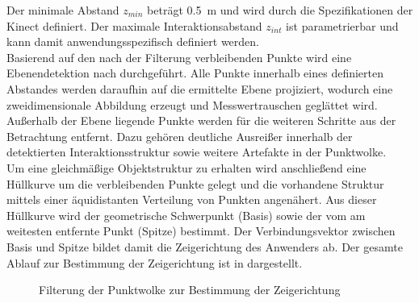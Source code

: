 Der minimale Abstand $z_{min}$ beträgt \SI{0,5}{\meter} und wird durch die Spezifikationen der Kinect definiert. Der maximale Interaktionsabstand $z_{int}$ ist parametrierbar und kann damit anwendungsspezifisch definiert werden.\\

Basierend auf den nach der Filterung verbleibenden Punkte wird eine Ebenendetektion nach \cite{Fischler1981} durchgeführt. Alle Punkte innerhalb eines definierten Abstandes werden daraufhin auf die ermittelte Ebene projiziert, wodurch eine zweidimensionale Abbildung erzeugt und Messwertrauschen geglättet wird. Außerhalb der Ebene liegende Punkte werden für die weiteren Schritte aus der Betrachtung entfernt. Dazu gehören deutliche Ausreißer innerhalb der detektierten Interaktionsstruktur sowie weitere Artefakte in der Punktwolke.\\

Um eine gleichmäßige Objektstruktur zu erhalten wird anschließend eine Hüllkurve um die verbleibenden Punkte gelegt und die vorhandene Struktur mittels einer äquidistanten Verteilung von Punkten angenähert. Aus dieser Hüllkurve wird der geometrische Schwerpunkt (Basis) sowie der vom \kps{} am weitesten entfernte Punkt (Spitze) bestimmt. Der Verbindungsvektor zwischen Basis und Spitze bildet damit die Zeigerichtung des Anwenders ab. Der gesamte Ablauf zur Bestimmung der Zeigerichtung ist in  dargestellt.\\

\begin{figure}[!ht]
	\begin{center}
	\hspace{5mm}
	\hspace{5mm}
	\caption{Filterung der Punktwolke zur Bestimmung der Zeigerichtung}
	\label{fig.intdir}
	\end{center}
\end{figure}

